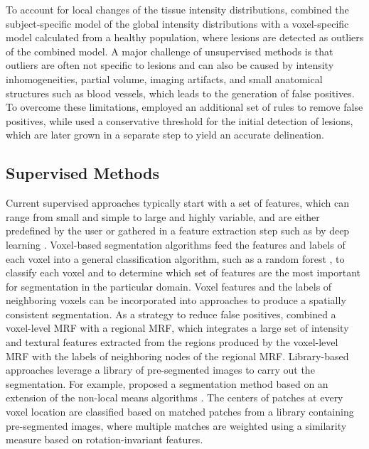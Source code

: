 To account for local changes of the tissue intensity distributions,
\citet{tomas2015} combined the subject-specific model of
the global intensity distributions with a voxel-specific model calculated from a
healthy population, where lesions are detected as outliers of the combined
model. A major challenge of unsupervised methods is that outliers are often not
specific to lesions and can also be caused by intensity inhomogeneities, partial
volume, imaging artifacts, and small anatomical structures such as blood
vessels, which leads to the generation of false positives. To overcome these
limitations, \citet{roura2015} employed an additional set of rules
to remove false positives, while \citet{schmidt2012} used
a conservative threshold for the initial detection of lesions, which are later
grown in a separate step to yield an accurate delineation.

\subsection[Supervised methods]{Supervised Methods}

Current supervised approaches typically start with a set of features, which can
range from small and simple to large and highly variable, and are either
predefined by the user \citep{geremia2010,geremia2011,guizard2015,subbanna2015}
or gathered in a feature extraction step such as by deep learning \citep{yoo2014}.
Voxel-based segmentation algorithms \citep{geremia2010,yoo2014} feed the
features and labels of each voxel into a general classification algorithm, such
as a random forest \citep{breiman2001}, to classify each voxel and to determine
which set of features are the most important for segmentation in the particular
domain. Voxel features and the labels of neighboring voxels can be incorporated
into  approaches
\citep{subbanna2009,subbanna2015} to produce a spatially consistent
segmentation. As a strategy to reduce false positives, \citet{subbanna2015}
combined a voxel-level MRF with a regional MRF, which integrates a large
set of intensity and textural features extracted from the regions produced by the
voxel-level MRF with the labels of neighboring nodes of the regional MRF.
Library-based approaches leverage a library of pre-segmented images to carry out
the segmentation. For example, \citet{guizard2015} proposed a segmentation
method based on an extension of the non-local means algorithms
\citep{coupe2011}. The centers of patches at every voxel location are classified
based on matched patches from a library containing pre-segmented images, where
multiple matches are weighted using a similarity measure based on
rotation-invariant features.


